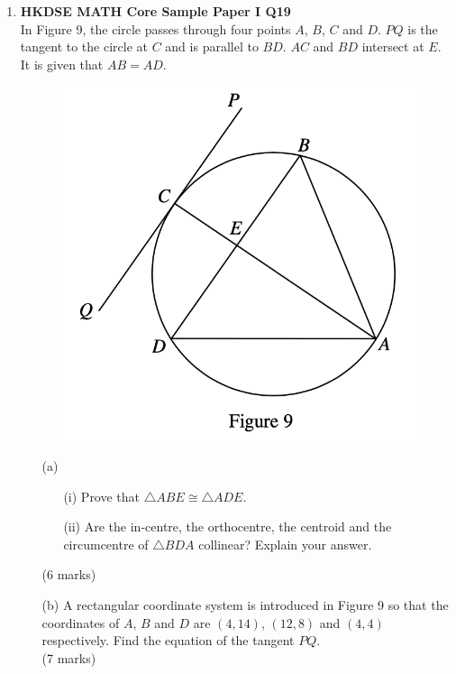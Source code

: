 \documentclass[12pt]{article}
\begin{document}
\begin{enumerate}
	\item \textbf{HKDSE MATH Core Sample Paper I Q19}\\
	In Figure 9, the circle passes through four points $A$, $B$, $C$ and $D$. $PQ$ is the tangent to the circle at $C$ and is parallel to $BD$. $AC$ and $BD$ intersect at $E$. It is given that $AB = AD$.
	\begin{figure}[H]
		\centering
		\includegraphics[width = .5\linewidth]{SPFigure1.9}
	\end{figure}
	\begin{enumerate}
		\item[(a)]
		\begin{enumerate}
			\item[(i)] Prove that $\triangle ABE \cong \triangle ADE$.
			\item[(ii)] Are the in-centre, the orthocentre, the centroid and the circumcentre of $\triangle BDA$ collinear? Explain your answer.
		\end{enumerate}
		(6 marks)
		\item[(b)] A rectangular coordinate system is introduced in Figure 9 so that the coordinates of $A$, $B$ and $D$ are $(4,14)$, $(12,8)$ and $(4,4)$ respectively. Find the equation of the tangent $PQ$. \\(7 marks)
	\end{enumerate}
\end{enumerate}
\end{document}
